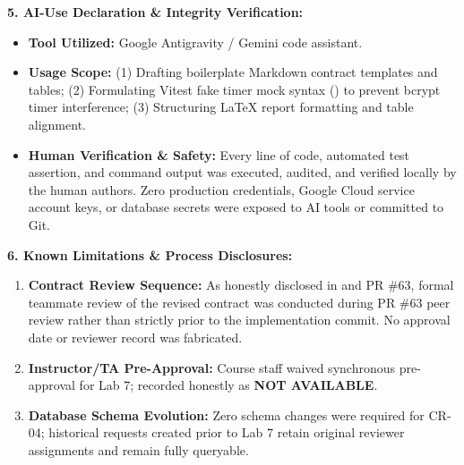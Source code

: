 \documentclass[10pt,a4paper]{article}
\newcommand{\code}[1]{\texttt{\detokenize{#1}}}
\begin{document}
\textbf{5. AI-Use Declaration \& Integrity Verification:}
\begin{itemize}[leftmargin=*,itemsep=1pt,topsep=1pt]
  \item \textbf{Tool Utilized:} Google Antigravity / Gemini code assistant.
  \item \textbf{Usage Scope:} (1) Drafting boilerplate Markdown contract templates and tables; (2) Formulating Vitest fake timer mock syntax (\code{{toFake: ['Date']}}) to prevent bcrypt timer interference; (3) Structuring LaTeX report formatting and table alignment.
  \item \textbf{Human Verification \& Safety:} Every line of code, automated test assertion, and command output was executed, audited, and verified locally by the human authors. Zero production credentials, Google Cloud service account keys, or database secrets were exposed to AI tools or committed to Git.
\end{itemize}

\textbf{6. Known Limitations \& Process Disclosures:}
\begin{enumerate}[leftmargin=*,itemsep=1pt,topsep=1pt]
  \item \textbf{Contract Review Sequence:} As honestly disclosed in  and PR \#63, formal teammate review of the revised contract was conducted during PR \#63 peer review rather than strictly prior to the implementation commit. No approval date or reviewer record was fabricated.
  \item \textbf{Instructor/TA Pre-Approval:} Course staff waived synchronous pre-approval for Lab 7; recorded honestly as \textbf{NOT AVAILABLE}.
  \item \textbf{Database Schema Evolution:} Zero schema changes were required for CR-04; historical requests created prior to Lab 7 retain original reviewer assignments and remain fully queryable.
\end{enumerate}
\end{document}
